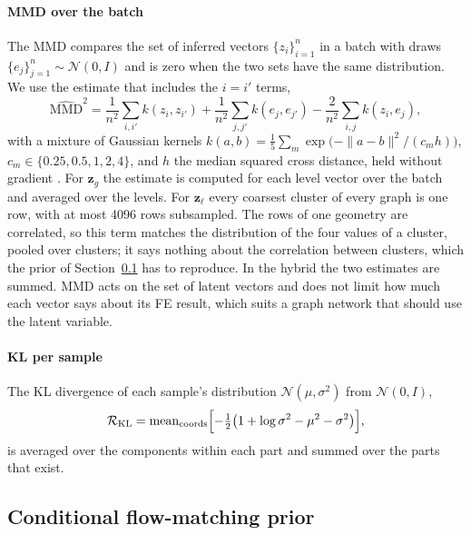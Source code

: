 \documentclass[preprint,12pt]{elsarticle}
\newcommand{\N}{\mathcal{N}}
\newcommand{\zg}{\mathbf{z}_{g}}
\newcommand{\zl}{\mathbf{z}_{\ell}}
\begin{document}
\paragraph{MMD over the batch} The MMD compares the set of inferred vectors $\{z_i\}_{i=1}^n$ in a
batch with draws $\{e_j\}_{j=1}^n\sim\N(0,I)$ and is zero when the two sets have the same
distribution. We use the estimate that includes the $i=i'$ terms,
\begin{equation}
  \widehat{\mathrm{MMD}}^2 = \frac{1}{n^2}\sum_{i,i'}k(z_i,z_{i'})
  + \frac{1}{n^2}\sum_{j,j'}k(e_j,e_{j'}) - \frac{2}{n^2}\sum_{i,j}k(z_i,e_j),
\end{equation}
with a mixture of Gaussian kernels $k(a,b)=\frac15\sum_{m}\exp\bigl(-\|a-b\|^2/(c_m h)\bigr)$,
$c_m\in\{0.25,0.5,1,2,4\}$, and $h$ the median squared cross distance, held without gradient
\cite{gretton2012kernel,zhao2019infovae,tolstikhin2018wae}. For $\zg$ the estimate is computed
for each level vector over the batch and averaged over the levels. For $\zl$ every coarsest
cluster of every graph is one row, with at most 4096 rows subsampled. The rows of one geometry are
correlated, so this term matches the distribution of the four values of a cluster, pooled over
clusters; it says nothing about the correlation between clusters, which the prior of
Section~\ref{sec:prior} has to reproduce. In the hybrid the two estimates are summed. MMD acts on
the set of latent vectors and does not limit how much each vector says about its FE result, which
suits a graph network that should use the latent variable.

\paragraph{KL per sample} The KL divergence of each sample's distribution $\N(\mu,\sigma^2)$ from
$\N(0,I)$,
\begin{equation}
  \mathcal{R}_{\mathrm{KL}} = \operatorname{mean}_{\text{coords}}
  \Bigl[-\tfrac12\bigl(1+\log\sigma^2-\mu^2-\sigma^2\bigr)\Bigr],
\end{equation}
is averaged over the components within each part and summed over the parts that exist.

\subsection{Conditional flow-matching prior}\label{sec:prior}
\end{document}
